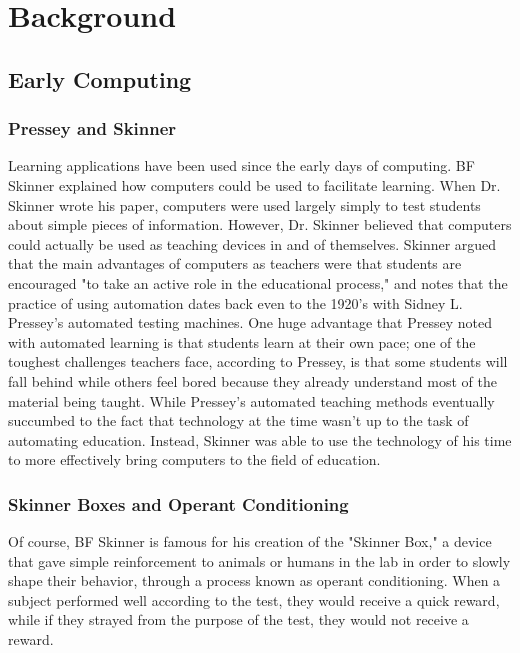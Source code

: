 \chapter{Background}
\section{Early Computing}

\subsection{Pressey and Skinner}
Learning applications have been used since the early days of computing. BF Skinner \cite{skinner1958teaching} explained how computers could be used to facilitate learning. When Dr. Skinner wrote his paper, computers were used largely simply to test students about simple pieces of information. However, Dr. Skinner believed that computers could actually be used as teaching devices in and of themselves. Skinner argued that the main advantages of computers as teachers were that students are encouraged "to take an active role in the educational process," and notes that the practice of using automation dates back even to the 1920's with Sidney L. Pressey's automated testing machines. One huge advantage that Pressey noted with automated learning is that students learn at their own pace; one of the toughest challenges teachers face, according to Pressey, is that some students will fall behind while others feel bored because they already understand most of the material being taught. While Pressey's automated teaching methods eventually succumbed to the fact that technology at the time wasn't up to the task of automating education. Instead, Skinner was able to use the technology of his time to more effectively bring computers to the field of education.

\subsection{Skinner Boxes and Operant Conditioning}
Of course, BF Skinner is famous for his creation of the "Skinner Box," \cite{skinner1963operant} a device that gave simple reinforcement to animals or humans in the lab in order to slowly shape their behavior, through a process known as operant conditioning. When a subject performed well according to the test, they would receive a quick reward, while if they strayed from the purpose of the test, they would not receive a reward.

